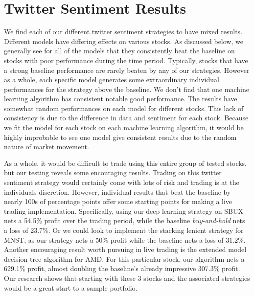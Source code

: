 \documentclass[../thesis.tex]{subfiles}
\begin{document}
\chapter{Twitter Sentiment Results}
\label{ch:sentimentresults}

We find each of our different twitter sentiment strategies to have mixed results. Different models have differing effects on various stocks. As discussed below, we generally see for all of the models that they consistently beat the baseline on stocks with poor performance during the time period. Typically, stocks that have a strong baseline performance are rarely beaten by any of our strategies. However as a whole, each specific model generates some extraordinary individual performances for the strategy above the baseline. We don't find that one machine learning algorithm has consistent notable good performance. The results have somewhat random performances on each model for different stocks. This lack of consistency is due to the difference in data and sentiment for each stock. Because we fit the model for each stock on each machine learning algorithm, it would be highly improbable to see one model give consistent results due to the random nature of market movement. 

As a whole, it would be difficult to trade using this entire group of tested stocks, but our testing reveals some encouraging results. Trading on this twitter sentiment strategy would certainly come with lots of risk and trading is at the individuals discretion. However, individual results that beat the baseline by nearly 100s of percentage points offer some starting points for making a live trading implementation. Specifically, using our deep learning strategy on SBUX nets a 54.5\% profit over the trading period, while the baseline \textit{buy-and-hold} nets a loss of 23.7\%. Or we could look to implement the stacking lenient strategy for MNST, as our strategy nets a 50\% profit while the baseline nets a loss of 31.2\%. Another encouraging result worth pursuing in live trading is the extended model decision tree algorithm for AMD. For this particular stock, our algorithm nets a 629.1\% profit, almost doubling the baseline's already impressive 307.3\% profit. Our research shows that starting with these 3 stocks and the associated strategies would be a great start to a sample portfolio.
\end{document}
